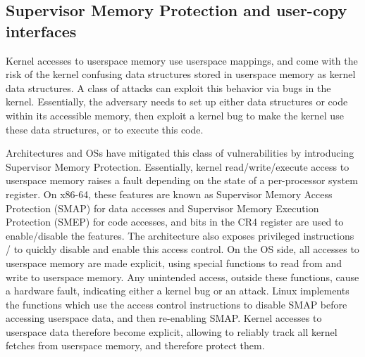 \documentclass[letterpaper,twocolumn,10pt, anonymous]{article}
\begin{document}
\subsection{Supervisor Memory Protection  and user-copy interfaces}

Kernel accesses to userspace memory use userspace mappings, and 
come with the risk of the kernel confusing data structures 
stored in userspace memory as kernel data structures.
A class of attacks can exploit this behavior via bugs in the 
kernel.
Essentially, the adversary needs to set up either data structures
or code within its accessible memory, then exploit a kernel 
bug to make the kernel use these data structures, or to execute 
this code.

Architectures and OSs have mitigated this class of vulnerabilities
by introducing Supervisor Memory Protection.
Essentially, kernel read/write/execute access to userspace memory
raises a fault depending on the state of a per-processor system 
register.
On x86-64, these features are known as Supervisor Memory Access 
Protection (SMAP) for data accesses and Supervisor Memory Execution 
Protection (SMEP) for code accesses, and bits in the CR4 register 
are used to enable/disable the features.
The architecture also exposes privileged instructions 
/ to quickly disable and enable this access 
control.
On the OS side, all accesses to userspace memory are made explicit, 
using special functions to read from and write to userspace memory.
Any unintended access, outside these functions, cause a 
hardware fault, indicating either a kernel bug or an attack.
Linux implements the functions  which 
use the access control instructions to disable SMAP before 
accessing userspace data, and then re-enabling SMAP.
Kernel accesses to userspace data therefore become explicit, allowing
\tiktok to reliably track all kernel fetches from userspace memory, 
and therefore protect them.
\end{document}

